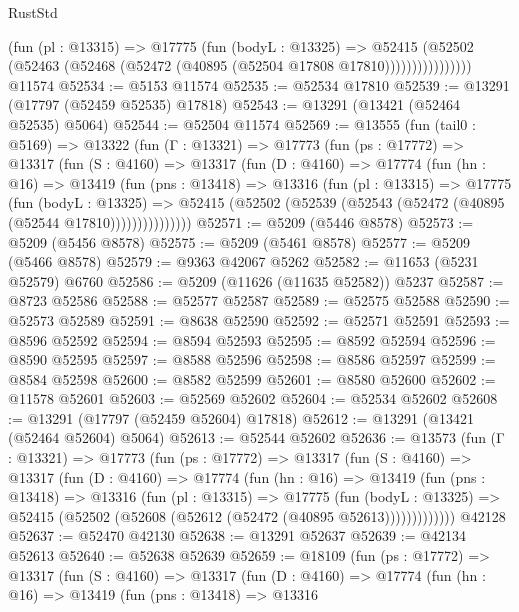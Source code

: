 \begin{lexlean}{RustStd}
\begin{coremodule}
                    (fun (pl : @13315) =>
                    @17775
                      (fun (bodyL : @13325) =>
                      @52415
                        (@52502
                          (@52463 (@52468 (@52472 (@40895 (@52504 @17808 @17810))))))))))))))))
    @11574
@52534 := @5153 @11574
@52535 := @52534 @17810
@52539 := @13291 (@17797 (@52459 @52535) @17818)
@52543 := @13291 (@13421 (@52464 @52535) @5064)
@52544 := @52504 @11574
@52569 := @13555
    (fun (tail0 : @5169) =>
    @13322
      (fun (Γ : @13321) =>
      @17773
        (fun (ps : @17772) =>
        @13317
          (fun (S : @4160) =>
          @13317
            (fun (D : @4160) =>
            @17774
              (fun (hn : @16) =>
              @13419
                (fun (pns : @13418) =>
                @13316
                  (fun (pl : @13315) =>
                  @17775
                    (fun (bodyL : @13325) =>
                    @52415 (@52502 (@52539 (@52543 (@52472 (@40895 (@52544 @17810)))))))))))))))
@52571 := @5209 (@5446 @8578)
@52573 := @5209 (@5456 @8578)
@52575 := @5209 (@5461 @8578)
@52577 := @5209 (@5466 @8578)
@52579 := @9363 @42067 @5262
@52582 := @11653 (@5231 @52579) @6760
@52586 := @5209 (@11626 (@11635 @52582)) @5237
@52587 := @8723 @52586
@52588 := @52577 @52587
@52589 := @52575 @52588
@52590 := @52573 @52589
@52591 := @8638 @52590
@52592 := @52571 @52591
@52593 := @8596 @52592
@52594 := @8594 @52593
@52595 := @8592 @52594
@52596 := @8590 @52595
@52597 := @8588 @52596
@52598 := @8586 @52597
@52599 := @8584 @52598
@52600 := @8582 @52599
@52601 := @8580 @52600
@52602 := @11578 @52601
@52603 := @52569 @52602
@52604 := @52534 @52602
@52608 := @13291 (@17797 (@52459 @52604) @17818)
@52612 := @13291 (@13421 (@52464 @52604) @5064)
@52613 := @52544 @52602
@52636 := @13573
    (fun (Γ : @13321) =>
    @17773
      (fun (ps : @17772) =>
      @13317
        (fun (S : @4160) =>
        @13317
          (fun (D : @4160) =>
          @17774
            (fun (hn : @16) =>
            @13419
              (fun (pns : @13418) =>
              @13316
                (fun (pl : @13315) =>
                @17775
                  (fun (bodyL : @13325) =>
                  @52415 (@52502 (@52608 (@52612 (@52472 (@40895 @52613)))))))))))))
    @42128
@52637 := @52470 @42130
@52638 := @13291 @52637
@52639 := @42134 @52613
@52640 := @52638 @52639
@52659 := @18109
    (fun (ps : @17772) =>
    @13317
      (fun (S : @4160) =>
      @13317
        (fun (D : @4160) =>
        @17774
          (fun (hn : @16) =>
          @13419
            (fun (pns : @13418) =>
            @13316

\end{coremodule}
\end{lexlean}
